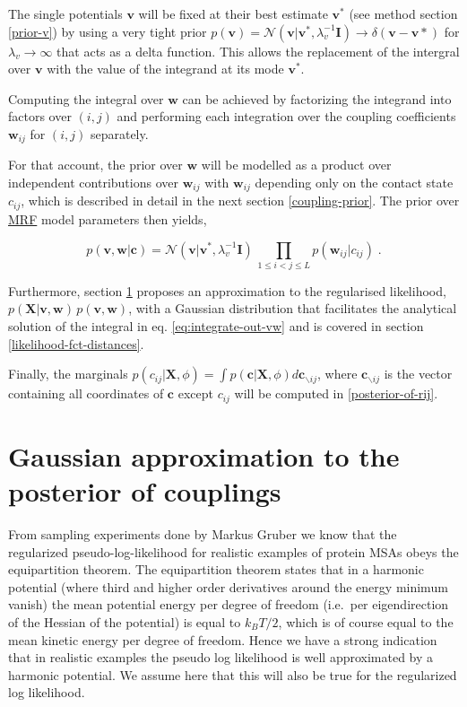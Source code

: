 \documentclass[11pt,a4paper,twoside]{book}
\newcommand{\Gauss}{\mathcal{N}}
\newcommand{\I}{\mathbf{I}}
\renewcommand{\c}{\mathbf{c}}
\newcommand{\cij}{c_{ij}}
\renewcommand{\v}{\mathbf{v}}
\newcommand{\w}{\mathbf{w}}
\newcommand{\wij}{\mathbf{w}_{ij}}
\newcommand{\X}{\mathbf{X}}
\theoremstyle{definition}
\theoremstyle{definition}
\theoremstyle{remark}
\begin{document}
The single potentials \(\v\) will be fixed at their best estimate
\(\v^*\) (see method section \ref{prior-v}) by using a very tight prior
\(p(\v) = \Gauss(\v|\v^*,\lambda_v^{-1} \I) \rightarrow \delta(\v-\v*)\)
for \(\lambda_v \rightarrow \infty\) that acts as a delta function. This
allows the replacement of the intergral over \(\v\) with the value of
the integrand at its mode \(\v^*\).

Computing the integral over \(\w\) can be achieved by factorizing the
integrand into factors over \((i,j)\) and performing each integration
over the coupling coefficients \(\wij\) for \((i,j)\) separately.

For that account, the prior over \(\w\) will be modelled as a product
over independent contributions over \(\wij\) with \(\wij\) depending
only on the contact state \(\cij\), which is described in detail in the
next section \ref{coupling-prior}. The prior over
\protect\hyperlink{abbrev}{MRF} model parameters then yields,

\begin{equation}
  p(\v,\w|\c) = \Gauss(\v|\v^*,\lambda_v^{-1} \I) \, \prod_{1\le i<j\le L} p(\wij|\cij) \; .
\label{eq:definition-parameter-prior}
\end{equation}

Furthermore, section \ref{laplace-approx} proposes an approximation to
the regularised likelihood, \(p(\X | \v,\w) \, p(\v, \w)\), with a
Gaussian distribution that facilitates the analytical solution of the
integral in eq. \eqref{eq:integrate-out-vw} and is covered in section
\ref{likelihood-fct-distances}.

Finally, the marginals
\(p(\cij | \X, \phi) = \int p(\c | \X, \phi) d \c_{\backslash ij}\),
where \(\c_{\backslash ij}\) is the vector containing all coordinates of
\(\c\) except \(\cij\) will be computed in \ref{posterior-of-rij}.

\section{Gaussian approximation to the posterior of
couplings}\label{laplace-approx}

From sampling experiments done by Markus Gruber we know that the
regularized pseudo-log-likelihood for realistic examples of protein MSAs
obeys the equipartition theorem. The equipartition theorem states that
in a harmonic potential (where third and higher order derivatives around
the energy minimum vanish) the mean potential energy per degree of
freedom (i.e.~per eigendirection of the Hessian of the potential) is
equal to \(k_B T/2\), which is of course equal to the mean kinetic
energy per degree of freedom. Hence we have a strong indication that in
realistic examples the pseudo log likelihood is well approximated by a
harmonic potential. We assume here that this will also be true for the
regularized log likelihood.
\end{document}

